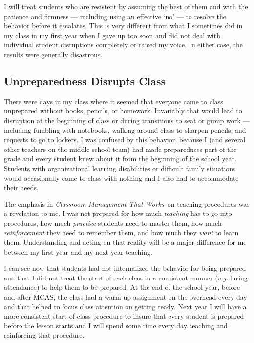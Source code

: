 \documentclass[11pt,twocolumn]{article}%
\def\foreign{\em}
\def\eg{{\foreign e.g.}}
\def\cmtw{{\em Classroom Management That Works}}
\begin{document}
I will treat students who are resistent by assuming the best of them
and with the patience and firmness --- including using an effective
`no' --- to resolve the behavior before it escalates. This is very
different from what I sometimes did in my class in my first year
when I gave up too soon and did not deal with individual student
disruptions completely or raised my voice. In either case, the
results were generally disastrous.

\subsection{Unpreparedness Disrupts Class}
\label{Unpreparedness Disrupts Class}

There were days in my class where it seemed that everyone came to
class unprepared without books, pencils, or homework. Invariably
that would lead to disruption at the beginning of class or during
transitions to seat or group work --- including fumbling with
notebooks, walking around class to sharpen pencils, and requests to
go to lockers. I was confused by this behavior, because I (and
several other teachers on the middle school team) had made
preparedness part of the grade and every student knew about it from
the beginning of the school year. Students with organizational
learning disabilities or difficult family situations would
occasionally come to class with nothing and I also had to
accommodate their needs.

The emphasis in \cmtw\ on teaching procedures was a revelation to
me. I was not prepared for how much {\em teaching} has to go into
procedures, how much {\em practice} students need to master them,
how much {\em reinforcement} they need to remember them, and how
much they {\em want} to learn them. Understanding and acting on that
reality will be a major difference for me between my first year and
my next year teaching.

I can see now that students had not internalized the behavior for
being prepared and that I did not treat the start of each class in a
consistent manner (\eg during attendance) to help them to be
prepared. At the end of the school year, before and after MCAS, the
class had a warm-up assignment on the overhead every day and that
helped to focus class attention on getting ready. Next year I will
have a more consistent start-of-class procedure to insure that every
student is prepared before the lesson starts and I will spend some
time every day teaching and reinforcing that procedure.
\end{document}
